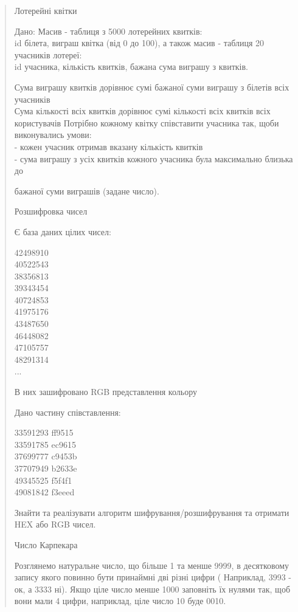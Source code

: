 \documentclass[]{article}
\begin{document}
\begin{quote}
Лотерейні квітки

Дано: Масив - таблиця з 5000 лотерейних квитків:\\
id білета, виграш квітка (від 0 до 100), а також масив - таблиця 20
учасників лотереї:\\
id учасника, кількість квитків, бажана сума виграшу з квитків.

Сума виграшу квитків дорівнює сумі бажаної суми виграшу з білетів всіх
учасників\\
Сума кількості всіх квитків дорівнює сумі кількості всіх квитків всіх
користувачів Потрібно кожному квітку співставити учасника так, щоби
виконувались умови:\\
- кожен учасник отримав вказану кількість квитків\\
- сума виграшу з усіх квитків кожного учасника була максимально близька
до

бажаної суми виграшів (задане число).

Розшифровка чисел

Є база даних цілих чисел:

42498910\\
40522543\\
38356813\\
39343454\\
40724853\\
41975176\\
43487650\\
46448082\\
47105757\\
48291314\\
...

В них зашифровано RGB представлення кольору

Дано частину співставлення:

33591293 ff9515\\
33591785 ec9615\\
37699777 c9453b\\
37707949 b2633e\\
49345525 f5f4f1\\
49081842 f3eeed

Знайти та реалізувати алгоритм шифрування/розшифрування та отримати HEX
або RGB чисел.

Число Карпекара

Розглянемо натуральне число, що більше 1 та менше 9999, в десятковому
запису якого повинно бути принаймні дві різні цифри ( Наприклад, 3993 -
ок, а 3333 ні). Якщо ціле число менше 1000 заповніть їх нулями так, щоб
вони мали 4 цифри, наприклад, ціле число 10 буде 0010.


\end{quote}
\end{document}
